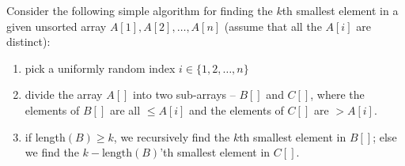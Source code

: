 \documentclass[addpoints]{exam}
\begin{document}
\begin{questions}

Consider the following simple algorithm for finding the $k$th smallest element in a given unsorted array $A[1], A[2], \dots, A[n]$ (assume that all the $A[i]$ are distinct):
\begin{enumerate}
\item pick a uniformly random index $i \in \{1, 2, \dots, n\}$
\item divide the array $A[]$ into two sub-arrays -- $B[]$ and $C[]$, where the elements of $B[]$ are all $\le A[i]$ and the elements of $C[]$ are $> A[i]$. 
\item if length$(B) \geq k$, we recursively find the $k$th smallest element in $B[]$; else we find the $k - \text{length}(B)$'th smallest element in $C[]$.
\end{enumerate}


\end{questions}
\end{document}
